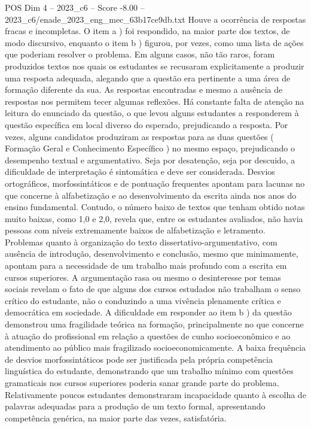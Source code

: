 \begin{textsample}{POS Dim 4 – 2023\_c6 – Score -8.00 – 2023\_c6/enade\_2023\_eng\_mec\_63b17ce9db.txt}
Houve a ocorrência de respostas fracas e incompletas.
O item a ) foi respondido, na maior parte dos textos, de modo discursivo, enquanto o item b ) figurou, por vezes, como uma lista de ações que poderiam resolver o problema.
Em alguns casos, não tão raros, foram produzidos textos nos quais os estudantes se recusaram explicitamente a produzir uma resposta adequada, alegando que a questão era pertinente a uma área de formação diferente da sua.
As respostas encontradas e mesmo a ausência de respostas nos permitem tecer algumas reflexões.
Há constante falta de atenção na leitura do enunciado da questão, o que levou alguns estudantes a responderem à questão específica em local diverso do esperado, prejudicando a resposta.
Por vezes, alguns candidatos produziram as respostas para as duas questões ( Formação Geral e Conhecimento Específico ) no mesmo espaço, prejudicando o desempenho textual e argumentativo.
Seja por desatenção, seja por descuido, a dificuldade de interpretação é sintomática e deve ser considerada.
Desvios ortográficos, morfossintáticos e de pontuação frequentes apontam para lacunas no que concerne à alfabetização e ao desenvolvimento da escrita ainda nos anos do ensino fundamental.
Contudo, o número baixo de textos que tenham obtido notas muito baixas, como 1,0 e 2,0, revela que, entre os estudantes avaliados, não havia pessoas com níveis extremamente baixos de alfabetização e letramento.
Problemas quanto à organização do texto dissertativo-argumentativo, com ausência de introdução, desenvolvimento e conclusão, mesmo que minimamente, apontam para a necessidade de um trabalho mais profundo com a escrita em cursos superiores.
A argumentação rasa ou mesmo o desinteresse por temas sociais revelam o fato de que alguns dos cursos estudados não trabalham o senso crítico do estudante, não o conduzindo a uma vivência plenamente crítica e democrática em sociedade.
A dificuldade em responder ao item b ) da questão demonstrou uma fragilidade teórica na formação, principalmente no que concerne à atuação do profissional em relação a questões de cunho socioeconômico e ao atendimento ao público mais fragilizado socioeconomicamente.
A baixa frequência de desvios morfossintáticos pode ser justificada pela própria competência linguística do estudante, demonstrando que um trabalho mínimo com questões gramaticais nos cursos superiores poderia sanar grande parte do problema.
Relativamente poucos estudantes demonstraram incapacidade quanto à escolha de palavras adequadas para a produção de um texto formal, apresentando competência genérica, na maior parte das vezes, satisfatória.

\end{textsample}
